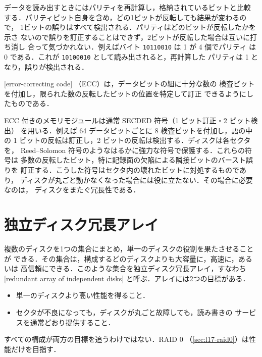 \documentclass[../main.tex]{subfiles}
\begin{document}
データを読み出すときにはパリティを再計算し，格納されているビットと比較
する．パリティビット自身を含め，どの1ビットが反転しても結果が変わるので，
1ビットの誤りはすべて検出される．パリティはどのビットが反転したかを示さ
ないので誤りを訂正することはできず，2ビットが反転した場合は互いに打ち消し
合って気づかれない．例えばバイト \texttt{10110010} は 1 が 4 個でパリティ
は 0 である．これが \texttt{10100010} として読み出されると，再計算した
パリティは 1 となり，誤りが検出される．

\begin{definition}[誤り訂正符号]
  [error-correcting code]%
  （ECC）は，データビットの組に十分な数の
  検査ビットを付加し，限られた数の反転したビットの位置を特定して訂正
  できるようにしたものである．
\end{definition}

ECC 付きのメモリモジュールは通常 SECDED 符号（1 ビット訂正・2 ビット検出）
を用いる．例えば 64 データビットごとに 8 検査ビットを付加し，語の中の
1 ビットの反転は訂正し，2 ビットの反転は検出する．ディスクは各セクタを，
Reed--Solomon 符号のようなはるかに強力な符号で保護する．これらの符号は
多数の反転したビット，特に記録面の欠陥による隣接ビットのバースト誤りを
訂正する．こうした符号はセクタ内の壊れたビットに対処するものであり，
ディスクが丸ごと動かなくなった場合には役に立たない．その場合に必要なのは，
ディスクをまたぐ冗長性である．

\section{独立ディスク冗長アレイ}
\label{sec:l17-raid}

複数のディスクを1つの集合にまとめ，単一のディスクの役割を果たさせることが
できる．その集合は，構成するどのディスクよりも大容量に，高速に，あるいは
高信頼にできる．このような集合を独立ディスク冗長アレイ，すなわち
[redundant array of independent disks]%
%
と呼ぶ．アレイには2つの目標がある．
\begin{itemize}
  \item 単一のディスクより高い性能を得ること．
  \item セクタが不良になっても，ディスクが丸ごと故障しても，読み書きの
    サービスを通常どおり提供すること．
\end{itemize}
すべての構成が両方の目標を追うわけではない．RAID 0%
（\cref{sec:l17-raid0}）は性能だけを目指す．
\end{document}
